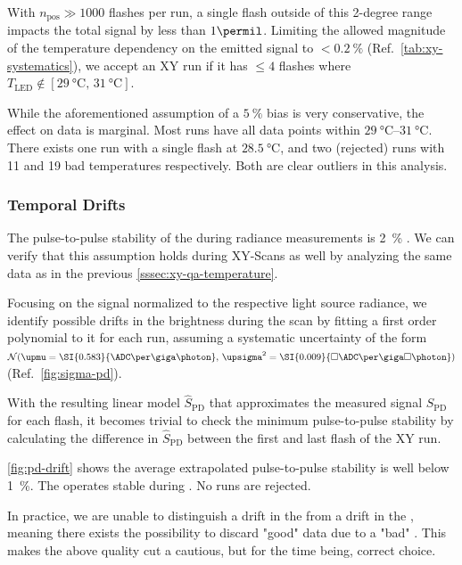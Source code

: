 With $n_\mathrm{pos} \gg 1000$ flashes per run, a single flash outside of this
2-degree range impacts the total signal by less than $1\permil$. Limiting the 
allowed magnitude of the temperature dependency on the emitted signal to 
$<\SI{0.2}{\percent}$ (Ref.~\cref{tab:xy-systematics}), we accept an XY run if 
it has $\leq4$ flashes where 
$T_\mathrm{LED}\notin[\SI{29}{\celsius},\,\SI{31}{\celsius}]$.

While the aforementioned assumption of a $\SI{5}{\percent}$ bias is very 
conservative, the effect on data is marginal. Most runs have all data points 
within $\SIrange{29}{31}{\celsius}$. There exists one run with a single flash at
$\SI{28.5}{\celsius}$, and two (rejected) runs with 11 and 19 bad temperatures 
respectively. Both are clear outliers in this analysis.

\subsubsection{Temporal Drifts}
\label{sssec:xy-qa-led-drift}

The pulse-to-pulse stability of the \CLS during radiance measurements is 
\SI{2}{\percent} \cite[p.~100]{schaferXYScannerVersatileMethod2023}. We can 
verify that this assumption holds during XY-Scans as well by analyzing the same
data as in the previous \cref{sssec:xy-qa-temperature}.

Focusing on the \PD signal normalized to the respective light source radiance, 
we identify possible drifts in the \CLS brightness during the scan by fitting
a first order polynomial to it for each run, assuming a systematic uncertainty 
of the form $\mathcal{N}(\upmu = \SI{0.583}{\ADC\per\giga\photon},\, 
\upsigma^2=\SI{0.009}{\square\ADC\per\giga\square\photon})$ 
(Ref.~\cref{fig:sigma-pd}).

With the resulting linear model $\hat{S}_\mathrm{PD}$ that approximates the 
measured signal $S_\mathrm{PD}$ for each flash, it becomes trivial to check the 
minimum pulse-to-pulse stability by calculating the difference in 
$\hat{S}_\mathrm{PD}$ between the first and last flash of the XY run.

\cref{fig:pd-drift} shows the average extrapolated pulse-to-pulse stability is 
well below \SI{1}{\percent}. The \CLS \LED operates stable during \DAQ. No runs 
are rejected. 

In practice, we are unable to distinguish a drift in the \LED from a drift in 
the \PD, meaning there exists the possibility to discard "good" data due to a 
"bad" \PD. This makes the above quality cut a cautious, but for the time being,
correct choice.

